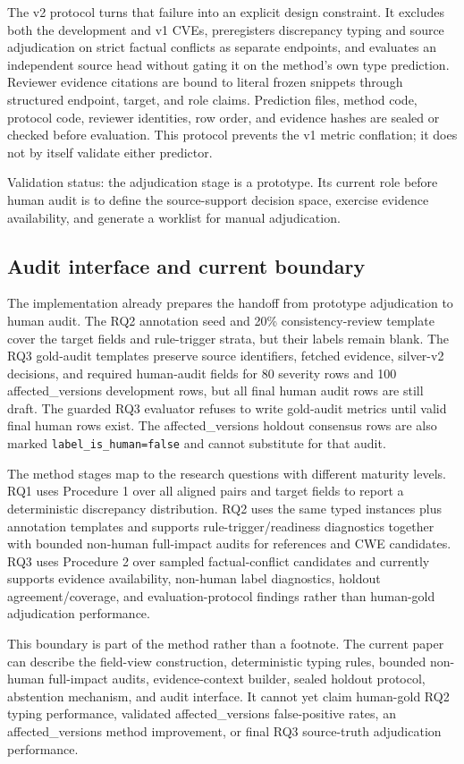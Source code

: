 The v2 protocol turns that failure into an explicit design constraint. It excludes both the development and v1 CVEs, preregisters discrepancy typing and source adjudication on strict factual conflicts as separate endpoints, and evaluates an independent source head without gating it on the method's own type prediction. Reviewer evidence citations are bound to literal frozen snippets through structured endpoint, target, and role claims. Prediction files, method code, protocol code, reviewer identities, row order, and evidence hashes are sealed or checked before evaluation. This protocol prevents the v1 metric conflation; it does not by itself validate either predictor.

Validation status: the adjudication stage is a prototype. Its current role before human audit is to define the source-support decision space, exercise evidence availability, and generate a worklist for manual adjudication.

\subsection{Audit interface and current boundary}

The implementation already prepares the handoff from prototype adjudication to human audit. The RQ2 annotation seed and 20\% consistency-review template cover the target fields and rule-trigger strata, but their labels remain blank. The RQ3 gold-audit templates preserve source identifiers, fetched evidence, silver-v2 decisions, and required human-audit fields for 80 severity rows and 100 affected\_versions development rows, but all final human audit rows are still draft. The guarded RQ3 evaluator refuses to write gold-audit metrics until valid final human rows exist. The affected\_versions holdout consensus rows are also marked \texttt{label\_is\_human=false} and cannot substitute for that audit.

The method stages map to the research questions with different maturity levels. RQ1 uses Procedure 1 over all aligned pairs and target fields to report a deterministic discrepancy distribution. RQ2 uses the same typed instances plus annotation templates and supports rule-trigger/readiness diagnostics together with bounded non-human full-impact audits for references and CWE candidates. RQ3 uses Procedure 2 over sampled factual-conflict candidates and currently supports evidence availability, non-human label diagnostics, holdout agreement/coverage, and evaluation-protocol findings rather than human-gold adjudication performance.

This boundary is part of the method rather than a footnote. The current paper can describe the field-view construction, deterministic typing rules, bounded non-human full-impact audits, evidence-context builder, sealed holdout protocol, abstention mechanism, and audit interface. It cannot yet claim human-gold RQ2 typing performance, validated affected\_versions false-positive rates, an affected\_versions method improvement, or final RQ3 source-truth adjudication performance.
